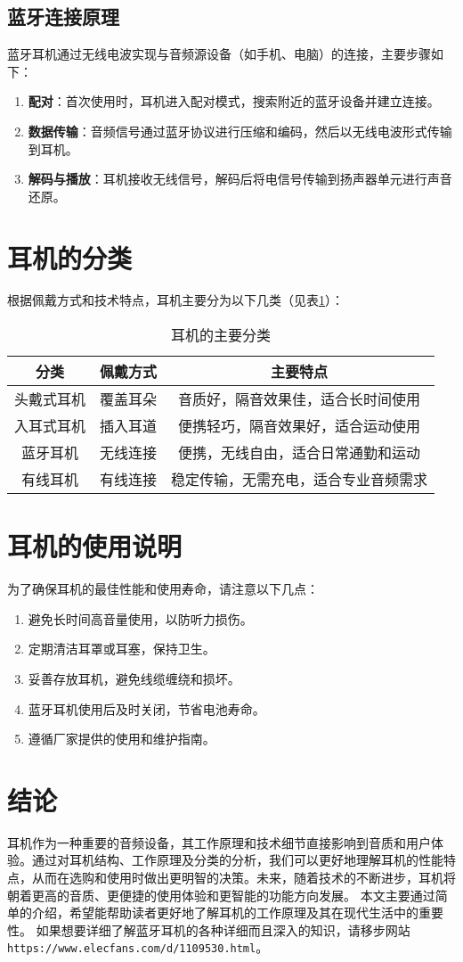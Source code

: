 \documentclass[UTF8]{ctexart}
\begin{document}
\subsection{蓝牙连接原理}
蓝牙耳机通过无线电波实现与音频源设备（如手机、电脑）的连接，主要步骤如下：
\begin{enumerate}
    \item \textbf{配对}：首次使用时，耳机进入配对模式，搜索附近的蓝牙设备并建立连接。
    \item \textbf{数据传输}：音频信号通过蓝牙协议进行压缩和编码，然后以无线电波形式传输到耳机。
    \item \textbf{解码与播放}：耳机接收无线信号，解码后将电信号传输到扬声器单元进行声音还原。
\end{enumerate}
\section{耳机的分类}
根据佩戴方式和技术特点，耳机主要分为以下几类（见表\ref{tab:earphone_types}）：
\begin{table}[htbp]
    \centering
    \caption{耳机的主要分类}
    \label{tab:earphone_types}
    \begin{tabular}{|c|c|c|}
        \hline
        分类 & 佩戴方式 & 主要特点 \\
        \hline
        头戴式耳机 & 覆盖耳朵 & 音质好，隔音效果佳，适合长时间使用 \\
        \hline
        入耳式耳机 & 插入耳道 & 便携轻巧，隔音效果好，适合运动使用 \\
        \hline
        蓝牙耳机 & 无线连接 & 便携，无线自由，适合日常通勤和运动 \\
        \hline
        有线耳机 & 有线连接 & 稳定传输，无需充电，适合专业音频需求 \\
        \hline
    \end{tabular}
\end{table}
\section{耳机的使用说明}
为了确保耳机的最佳性能和使用寿命，请注意以下几点：
\begin{enumerate}
    \item 避免长时间高音量使用，以防听力损伤。
    \item 定期清洁耳罩或耳塞，保持卫生。
    \item 妥善存放耳机，避免线缆缠绕和损坏。
    \item 蓝牙耳机使用后及时关闭，节省电池寿命。
    \item 遵循厂家提供的使用和维护指南。
\end{enumerate}
\section{结论}
耳机作为一种重要的音频设备，其工作原理和技术细节直接影响到音质和用户体验。通过对耳机结构、工作原理及分类的分析，我们可以更好地理解耳机的性能特点，从而在选购和使用时做出更明智的决策。未来，随着技术的不断进步，耳机将朝着更高的音质、更便捷的使用体验和更智能的功能方向发展。
本文主要通过简单的介绍，希望能帮助读者更好地了解耳机的工作原理及其在现代生活中的重要性。
如果想要详细了解蓝牙耳机的各种详细而且深入的知识，请移步网站\texttt{https://www.elecfans.com/d/1109530.html}。
\end{document}
